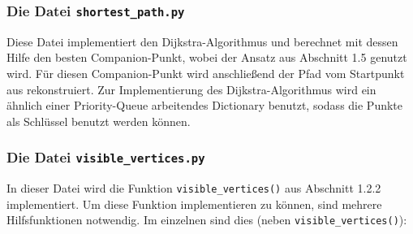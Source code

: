 \documentclass[a4paper, notitlepage, 12pt]{scrartcl}
\begin{document}
\subsubsection{Die Datei \texttt{shortest\_path.py}}
Diese Datei implementiert den Dijkstra-Algorithmus und berechnet mit dessen Hilfe den besten Companion-Punkt, wobei der Ansatz aus Abschnitt 1.5 genutzt wird. Für diesen Companion-Punkt wird anschließend der Pfad vom Startpunkt aus rekonstruiert. Zur Implementierung des Dijkstra-Algorithmus wird ein ähnlich einer Priority-Queue arbeitendes Dictionary benutzt, sodass die Punkte als Schlüssel benutzt werden können.
\subsubsection{Die Datei \texttt{visible\_vertices.py}}
In dieser Datei wird die Funktion \texttt{visible\_vertices()} aus Abschnitt 1.2.2 implementiert. Um diese Funktion implementieren zu können, sind mehrere Hilfsfunktionen notwendig. Im einzelnen sind dies (neben \texttt{visible\_vertices()}):
\end{document}
